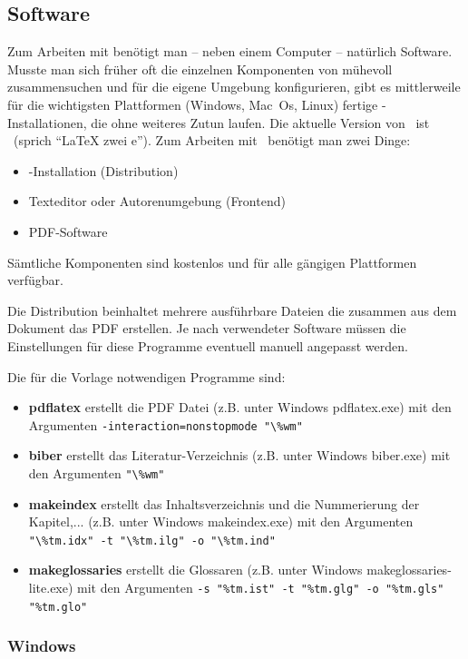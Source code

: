 \subsection{Software}

Zum Arbeiten mit \latex benötigt man -- neben einem Computer -- natürlich Software. Musste man sich früher oft die einzelnen Komponenten von \latex mühevoll zusammensuchen und für die eigene Umgebung konfigurieren, gibt es mittlerweile für die wichtigsten Plattformen (Windows, Mac~Os, Linux) fertige \latex-Installationen, die ohne weiteres Zutun laufen. Die aktuelle Version von \latex\ ist \LaTeXe\ (sprich "`LaTeX zwei e"'). 
Zum Arbeiten mit \latex\ benötigt man zwei Dinge:
%
\begin{itemize}
\item \latex-Installation (Distribution)
\item Texteditor oder Autorenumgebung (Frontend)
\item PDF-Software 
\end{itemize}
%
Sämtliche Komponenten sind kostenlos und für alle gängigen Plattformen verfügbar.

Die Distribution beinhaltet mehrere ausführbare Dateien die zusammen aus dem Dokument das PDF erstellen. Je nach verwendeter Software müssen die Einstellungen für diese Programme eventuell manuell angepasst werden.

Die für die Vorlage notwendigen Programme sind:
\begin{itemize}
	\item \textbf{pdflatex} erstellt die PDF Datei (z.B. unter Windows pdflatex.exe) mit den Argumenten \verb|-interaction=nonstopmode "\%wm" |
	\item \textbf{biber} erstellt das Literatur-Verzeichnis (z.B. unter Windows biber.exe) mit den Argumenten \verb|"\%wm" |
	\item \textbf{makeindex} erstellt das Inhaltsverzeichnis und die Nummerierung der Kapitel,... (z.B. unter Windows makeindex.exe) mit den Argumenten\\ \verb|"\%tm.idx" -t "\%tm.ilg" -o "\%tm.ind" |
	\item \textbf{makeglossaries} erstellt die Glossaren (z.B. unter Windows makeglossaries-lite.exe) mit den Argumenten \verb|-s "%tm.ist" -t "%tm.glg" -o "%tm.gls" "%tm.glo"|
\end{itemize}

\subsubsection{Windows}

